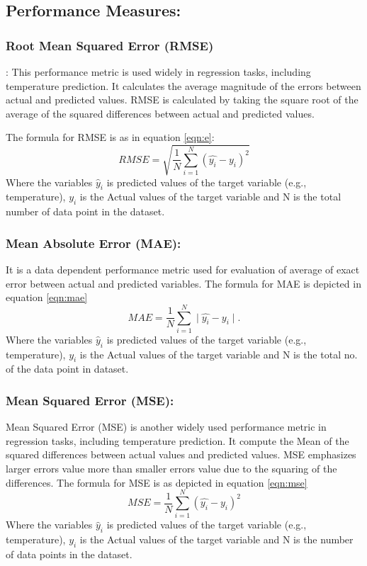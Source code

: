 \documentclass[sn-mathphys,Numbered]{sn-jnl}
\theoremstyle{thmstyleone}
\theoremstyle{thmstyletwo}
\theoremstyle{thmstylethree}
\begin{document}
\subsection {Performance Measures:}
\subsubsection{Root Mean Squared Error (RMSE)}:
This performance metric is used widely in regression tasks, including temperature prediction. It calculates the average magnitude of the errors between actual and predicted values. RMSE is calculated by taking the square root of the average of the squared differences between actual and predicted values.

The formula for RMSE is as in equation \ref{eqn:e}:
\begin{equation}
\label{eqn:e}
RMSE = \sqrt {\frac{1}{N} \sum_{i=1}^{N} (\hat{y_{i}} - y_{i})^2}
\end{equation}
Where the variables $\hat{y}_i$ is predicted values of the target variable (e.g., temperature), $y_i$ is the Actual values of the target variable and N is the total number of data point in the dataset.
\subsubsection {Mean Absolute Error (MAE):} It is a data dependent performance metric used for evaluation of average of exact error between actual and predicted variables. The formula for MAE is depicted in equation \ref{eqn:mae}
\begin{equation}
\label{eqn:mae}
MAE = \frac{1}{N} \sum_{i=1}^{N} \mid\hat{y_{i}} - y_{i}\mid .
\end{equation}
Where the variables $\hat{y}_i$ is predicted values of the target variable (e.g., temperature), $y_i$ is the Actual values of the target variable and N is the total no. of the data point in dataset.

\subsubsection {Mean Squared Error (MSE):}
Mean Squared Error (MSE) is another widely used performance metric in regression tasks, including temperature prediction. It compute the Mean of the squared differences between actual values and predicted values. MSE emphasizes larger errors value more than smaller errors value due to the squaring of the differences.
The formula for MSE is as depicted in equation \ref{eqn:mse}
\begin{equation}
\label{eqn:mse}
MSE = \frac{1}{N} \sum_{i=1}^{N} (\hat{y_{i}} - y_{i})^2
\end{equation}
Where the variables $\hat{y}_i$ is predicted values of the target variable (e.g., temperature), $y_i$ is the Actual values of the target variable and N is the number of data points in the dataset.
\end{document}
